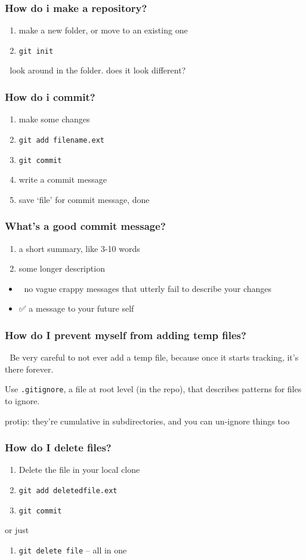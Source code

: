 \documentclass[14pt,aspectratio=1610]{beamer} %
\newcommand{\fframe}[2]{
   \begin{frame}
\frametitle{#1}
#2
\end{frame}
}
\begin{document}
\fframe{How do i make a repository?}
{
	\begin{enumerate}
		\item make a new folder, or move to an existing one
		\item {\tt git init}
	\end{enumerate}

\vspace{\baselineskip}

👀	look around in the folder.  does it look different?
}


\fframe{How do i commit?}
{
	\begin{enumerate}
		\item make some changes
		\item {\tt git add filename.ext}
		\item {\tt git commit}
		\item write a commit message
		\item save `file' for commit message, done
	\end{enumerate}
}

\fframe{What's a good commit message?}
{
	\begin{enumerate}
		\item a short summary, like 3-10 words
		\item some longer description
	\end{enumerate}

\begin{itemize}
		\item 🚫 no vague crappy messages that utterly fail to describe your changes
		\item ✅ a message to your future self
	\end{itemize}
}

\fframe{How do I prevent myself from adding temp files?}
{
	🔴 Be very careful to not ever add a temp file, because once it starts tracking, it's there forever.  

\vspace{\baselineskip}
	Use {\tt .gitignore}, a file at root level (in the repo), that describes patterns for files to ignore.

\vfill
	protip: they're cumulative in subdirectories, and you can un-ignore things too
}


\fframe{How do I delete files?}
{
	\begin{enumerate}
		\item Delete the file in your local clone
		\item {\tt git add deletedfile.ext}
		\item {\tt git commit}
	\end{enumerate}

	or just

	\begin{enumerate}
		\item {\tt git delete file} -- all in one
	\end{enumerate}
}
\end{document}
